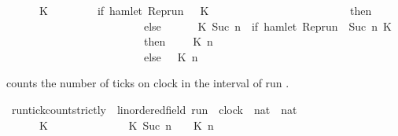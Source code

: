 \begin{isabellebody}
\ \ \ \ {\isacartoucheopen}{\isacharparenleft}{\isacharhash}\isactrlsub {\isasymle}\ {\isasymrho}\ K\ {}{\isacharparenright}\ \ \ \ \ \ \ {\isacharequal}\ {\isacharparenleft}if\ hamlet\ {\isacharparenleft}{\isacharparenleft}Rep{\isacharunderscore}run\ {\isasymrho}{\isacharparenright}\ {}\ K{\isacharparenright}\isanewline
\ \ \ \ \ \ \ \ \ \ \ \ \ \ \ \ \ \ \ \ \ \ \ \ \ then\ {}\isanewline
\ \ \ \ \ \ \ \ \ \ \ \ \ \ \ \ \ \ \ \ \ \ \ \ \ else\ {}{\isacharparenright}{\isacartoucheclose}\isanewline
\ \ {\isacharbar}\ {\isacartoucheopen}{\isacharparenleft}{\isacharhash}\isactrlsub {\isasymle}\ {\isasymrho}\ K\ {\isacharparenleft}Suc\ n{\isacharparenright}{\isacharparenright}\ {\isacharequal}\ {\isacharparenleft}if\ hamlet\ {\isacharparenleft}{\isacharparenleft}Rep{\isacharunderscore}run\ {\isasymrho}{\isacharparenright}\ {\isacharparenleft}Suc\ n{\isacharparenright}\ K{\isacharparenright}\isanewline
\ \ \ \ \ \ \ \ \ \ \ \ \ \ \ \ \ \ \ \ \ \ \ \ \ then\ {}\ {\isacharplus}\ {\isacharparenleft}{\isacharhash}\isactrlsub {\isasymle}\ {\isasymrho}\ K\ n{\isacharparenright}\isanewline
\ \ \ \ \ \ \ \ \ \ \ \ \ \ \ \ \ \ \ \ \ \ \ \ \ else\ {\isacharparenleft}{\isacharhash}\isactrlsub {\isasymle}\ {\isasymrho}\ K\ n{\isacharparenright}{\isacharparenright}{\isacartoucheclose}%
\begin{isamarkuptext}%
 counts the number of ticks on clock  
  in the interval \isatt{[0{\char`\,}\ n[} of run \isa{{\isasymrho}}.%
\end{isamarkuptext}\isamarkuptrue%
\isamarkupfalse%
\ run{\isacharunderscore}tick{\isacharunderscore}count{\isacharunderscore}strictly\ {\isacharcolon}{\isacharcolon}\ {\isacartoucheopen}{\isacharparenleft}{\isacharprime}{\isasymtau}{\isacharcolon}{\isacharcolon}linordered{\isacharunderscore}field{\isacharparenright}\ run\ {\isasymRightarrow}\ clock\ {\isasymRightarrow}\ nat\ {\isasymRightarrow}\ nat{\isacartoucheclose}\ {\isacharparenleft}{\isachardoublequoteopen}{\isacharhash}\isactrlsub {\isacharless}\ {\isacharunderscore}\ {\isacharunderscore}\ {\isacharunderscore}{\isachardoublequoteclose}{\isacharparenright}\isanewline
{}\isanewline
\ \ \ \ {\isacartoucheopen}{\isacharparenleft}{\isacharhash}\isactrlsub {\isacharless}\ {\isasymrho}\ K\ {}{\isacharparenright}\ \ \ \ \ \ \ {\isacharequal}\ {}{\isacartoucheclose}\isanewline
\ \ {\isacharbar}\ {\isacartoucheopen}{\isacharparenleft}{\isacharhash}\isactrlsub {\isacharless}\ {\isasymrho}\ K\ {\isacharparenleft}Suc\ n{\isacharparenright}{\isacharparenright}\ {\isacharequal}\ {\isacharhash}\isactrlsub {\isasymle}\ {\isasymrho}\ K\ n{\isacartoucheclose}\isanewline

\end{isabellebody}
